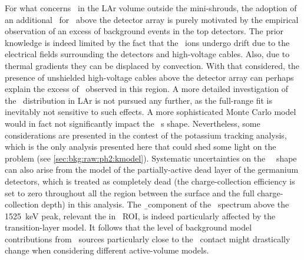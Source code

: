 \blocktitle{\kvz}
For what concerns \kvz\ in the LAr volume outside the mini-shrouds, the adoption of an
additional \pdf\ for \kvz\ above the detector array is purely motivated by the empirical
observation of an excess of background events in the top detectors. The prior knowledge is
indeed limited by the fact that the \kvz\ ions undergo drift due to the electrical fields
surrounding the detectors and high-voltage cables. Also, due to thermal gradients they can
be displaced by convection. With that considered, the presence of unshielded high-voltage
cables above the detector array can perhaps explain the excess of \kvz\ observed in this
region. A more detailed investigation of the \kvz\ distribution in LAr is not pursued any
further, as the full-range fit is inevitably not sensitive to such effects. A more
sophisticated Monte Carlo model would in fact not significantly impact the \kvz\ \pdf{}s
shape. Nevertheless, some considerations are presented in the contest of the
potassium tracking analysis, which is the only analysis presented here that could shed
some light on the problem (see \cref{sec:bkg:raw:ph2:kmodel}). Systematic uncertainties on
the \kvz\ \pdf\ shape can also arise from the model of the partially-active dead layer of
the germanium detectors, which is treated as completely dead (the charge-collection
efficiency is set to zero throughout all the region between the surface and the full
charge-collection depth) in this analysis. The \b\ component of the \kvz\ spectrum above
the 1525~keV peak, relevant the in \onbb\ ROI, is indeed particularly affected by the
transition-layer model. It follows that the level of background model contributions from
\kvz\ sources particularly close to the \nplus\ contact might drastically change when
considering different active-volume models.

